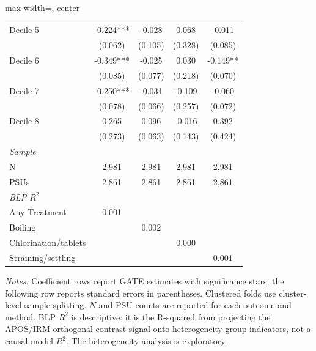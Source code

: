 \begin{landscape}
\begin{table}[p]
\begin{adjustbox}{max width=\linewidth, center}
\begin{tabular}{lcccc}
Decile 5 & -0.224*** & -0.028 & 0.068 & -0.011 \\
 & (0.062) & (0.105) & (0.328) & (0.085) \\
Decile 6 & -0.349*** & -0.025 & 0.030 & -0.149** \\
 & (0.085) & (0.077) & (0.218) & (0.070) \\
Decile 7 & -0.250*** & -0.031 & -0.109 & -0.060 \\
 & (0.078) & (0.066) & (0.257) & (0.072) \\
Decile 8 & 0.265 & 0.096 & -0.016 & 0.392 \\
 & (0.273) & (0.063) & (0.143) & (0.424) \\
\multicolumn{5}{l}{\textit{Sample}} \\
\quad N & 2,981 & 2,981 & 2,981 & 2,981 \\
\quad PSUs & 2,861 & 2,861 & 2,861 & 2,861 \\
\multicolumn{5}{l}{\textit{BLP $R^{2}$}} \\
\quad Any Treatment & 0.001 &  &  &  \\
\quad Boiling &  & 0.002 &  &  \\
\quad Chlorination/tablets &  &  & 0.000 &  \\
\quad Straining/settling &  &  &  & 0.001 \\
\bottomrule
\end{tabular}
\end{adjustbox}
\par\vspace{3pt}
\begin{minipage}{\linewidth}\footnotesize \textit{Notes:} Coefficient rows report GATE estimates with significance stars; the following row reports standard errors in parentheses. Clustered folds use cluster-level sample splitting. $N$ and PSU counts are reported for each outcome and method. BLP $R^2$ is descriptive: it is the R-squared from projecting the APOS/IRM orthogonal contrast signal onto heterogeneity-group indicators, not a causal-model $R^2$. The heterogeneity analysis is exploratory.\end{minipage}
\end{table}
\end{landscape}
